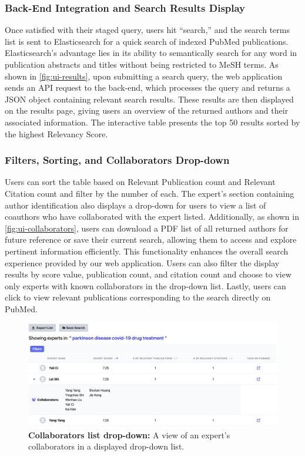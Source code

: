 \subsubsection{Back-End Integration and Search Results Display}

Once satisfied with their staged query, users hit ``search,'' and the search terms list is sent to Elasticsearch for a quick search of indexed PubMed publications. Elasticsearch's advantage lies in its ability to semantically search for any word in publication abstracts and titles without being restricted to MeSH terms. As shown in \autoref{fig:ui-results}, upon submitting a search query, the web application sends an API request to the back-end, which processes the query and returns a JSON object containing relevant search results. These results are then displayed on the results page, giving users an overview of the returned authors and their associated information. The interactive table presents the top 50 results sorted by the highest Relevancy Score.

\subsubsection{Filters, Sorting, and Collaborators Drop-down}

Users can sort the table based on Relevant Publication count and Relevant Citation count and filter by the number of each. The expert's section containing author identification also displays a drop-down for users to view a list of coauthors who have collaborated with the expert listed. Additionally, as shown in \autoref{fig:ui-collaborators}, users can download a PDF list of all returned authors for future reference or save their current search, allowing them to access and explore pertinent information efficiently. This functionality enhances the overall search experience provided by our web application. Users can also filter the display results by score value, publication count, and citation count and choose to view only experts with known collaborators in the drop-down list. Lastly, users can click to view relevant publications corresponding to the search directly on PubMed. 

\begin{figure}[ht!]
    \tiny
    \centering
    \includegraphics[width=\figwidth]{Images/ui-collaborators.png}
    \caption[Collaborators List Drop-Down]{\textbf{Collaborators list drop-down:} A view of an expert's collaborators in a displayed drop-down list.}
    \label{fig:ui-collaborators}
\end{figure}
